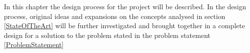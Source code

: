 In this chapter the design process for the project will be described. In the design process, original ideas and expansions on the concepts analysed in section \cref{StateOfTheArt} will be further investigated and brought together in a complete design for a solution to the problem stated in the problem statement \cref{ProblemStatement}